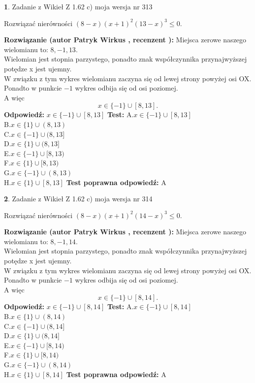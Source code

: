 \documentclass[12pt, a4paper]{article}
\theoremstyle{definition} %
\newtheorem{zad}{}
\newcommand{\zadStart}[1]{\begin{zad}#1\newline}
\newcommand{\zadStop}{\end{zad}}
\newcommand{\rozwStart}[2]{\noindent \textbf{Rozwiązanie (autor #1 , recenzent #2): }\newline}
\newcommand{\rozwStop}{\newline}
\newcommand{\odpStart}{\noindent \textbf{Odpowiedź:}\newline}
\newcommand{\odpStop}{\newline}
\newcommand{\testStart}{\noindent \textbf{Test:}\newline}
\newcommand{\testStop}{\newline}
\newcommand{\kluczStart}{\noindent \textbf{Test poprawna odpowiedź:}\newline}
\newcommand{\kluczStop}{\newline}
\begin{document}
\zadStart{Zadanie z Wikieł Z 1.62 c) moja wersja nr 313}

Rozwiązać nierówności $(8-x)(x+1)^{2}(13-x)^{3}\le0$.
\zadStop
\rozwStart{Patryk Wirkus}{}
Miejsca zerowe naszego wielomianu to: $8, -1, 13$.\\
Wielomian jest stopnia parzystego, ponadto znak współczynnika przy\linebreak najwyższej potędze x jest ujemny.\\ W związku z tym wykres wielomianu zaczyna się od lewej strony powyżej osi OX.\\
Ponadto w punkcie $-1$ wykres odbija się od osi poziomej.\\
A więc $$x \in \{-1\} \cup [8,13].$$
\rozwStop
\odpStart
$x \in \{-1\} \cup [8,13]$
\odpStop
\testStart
A.$x \in \{-1\} \cup [8,13]$\\
B.$x \in \{1\} \cup (8,13)$\\
C.$x \in \{-1\} \cup (8,13]$\\
D.$x \in \{1\} \cup (8,13]$\\
E.$x \in \{-1\} \cup [8,13)$\\
F.$x \in \{1\} \cup [8,13)$\\
G.$x \in \{-1\} \cup (8,13)$\\
H.$x \in \{1\} \cup [8,13]$
\testStop
\kluczStart
A
\kluczStop



\zadStart{Zadanie z Wikieł Z 1.62 c) moja wersja nr 314}

Rozwiązać nierówności $(8-x)(x+1)^{2}(14-x)^{3}\le0$.
\zadStop
\rozwStart{Patryk Wirkus}{}
Miejsca zerowe naszego wielomianu to: $8, -1, 14$.\\
Wielomian jest stopnia parzystego, ponadto znak współczynnika przy\linebreak najwyższej potędze x jest ujemny.\\ W związku z tym wykres wielomianu zaczyna się od lewej strony powyżej osi OX.\\
Ponadto w punkcie $-1$ wykres odbija się od osi poziomej.\\
A więc $$x \in \{-1\} \cup [8,14].$$
\rozwStop
\odpStart
$x \in \{-1\} \cup [8,14]$
\odpStop
\testStart
A.$x \in \{-1\} \cup [8,14]$\\
B.$x \in \{1\} \cup (8,14)$\\
C.$x \in \{-1\} \cup (8,14]$\\
D.$x \in \{1\} \cup (8,14]$\\
E.$x \in \{-1\} \cup [8,14)$\\
F.$x \in \{1\} \cup [8,14)$\\
G.$x \in \{-1\} \cup (8,14)$\\
H.$x \in \{1\} \cup [8,14]$
\testStop
\kluczStart
A
\kluczStop
\end{document}
